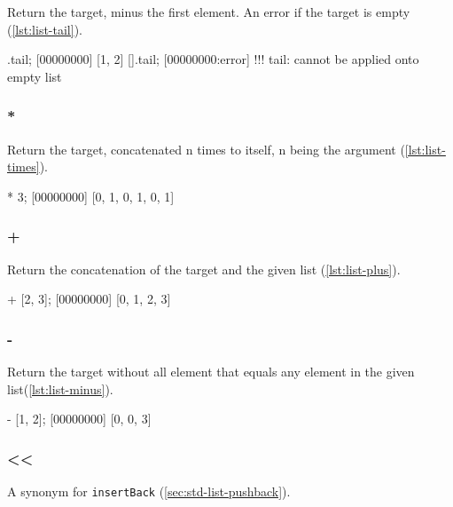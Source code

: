 Return the target, minus the first element. An error if the target is
empty (\autoref{lst:list-tail}).

\begin{urbiscript}[caption=List.tail, label=lst:list-tail]
[0, 1, 2].tail;
[00000000] [1, 2]
[].tail;
[00000000:error] !!! tail: cannot be applied onto empty list
\end{urbiscript}

\subsubsection{*}

Return the target, concatenated n times to itself, n being the
argument (\autoref{lst:list-times}).

\begin{urbiscript}[caption={\lstinline|List.'*'|}, label=lst:list-times]
[0, 1] * 3;
[00000000] [0, 1, 0, 1, 0, 1]
\end{urbiscript}

\subsubsection{+}

Return the concatenation of the target and the given list
(\autoref{lst:list-plus}).

\begin{urbiscript}[caption={\lstinline|List.'+'|}, label=lst:list-plus,
  float=\floatpos]
[0, 1] + [2, 3];
[00000000] [0, 1, 2, 3]
\end{urbiscript}

\subsubsection{-}

Return the target without all element that equals any element in the
given list(\autoref{lst:list-minus}).

\begin{urbiscript}[caption={\lstinline|List.'-'|}, label=lst:list-minus,
  float=\floatpos]
[0, 1, 0, 2, 3] - [1, 2];
[00000000] [0, 0, 3]
\end{urbiscript}

\subsubsection{\textless\textless}

A synonym for \lstinline|insertBack| (\autoref{sec:std-list-pushback}).

